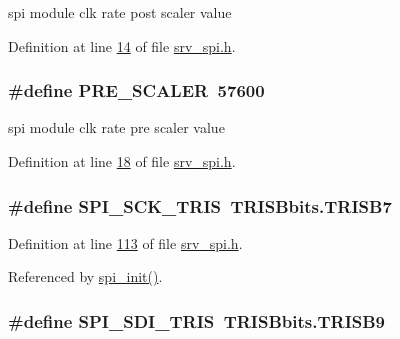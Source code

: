 spi module clk rate post scaler value 



Definition at line \hyperlink{a00013_source_l00014}{14} of file \hyperlink{a00013_source}{srv\+\_\+spi.\+h}.

\hypertarget{a00013_a5c1fd7fa207a92f0b4b78d39bbd2f34b}{
\subsubsection[{P\+R\+E\+\_\+\+S\+C\+A\+L\+E\+R}]{\setlength{\rightskip}{0pt plus 5cm}\#define P\+R\+E\+\_\+\+S\+C\+A\+L\+E\+R~57600}}\label{a00013_a5c1fd7fa207a92f0b4b78d39bbd2f34b}


spi module clk rate pre scaler value 



Definition at line \hyperlink{a00013_source_l00018}{18} of file \hyperlink{a00013_source}{srv\+\_\+spi.\+h}.

\hypertarget{a00013_a98c4bd0ee0f76eb205e874355bf9cd33}{
\subsubsection[{S\+P\+I\+\_\+\+S\+C\+K\+\_\+\+T\+R\+I\+S}]{\setlength{\rightskip}{0pt plus 5cm}\#define S\+P\+I\+\_\+\+S\+C\+K\+\_\+\+T\+R\+I\+S~T\+R\+I\+S\+Bbits.\+T\+R\+I\+S\+B7}}\label{a00013_a98c4bd0ee0f76eb205e874355bf9cd33}


Definition at line \hyperlink{a00013_source_l00113}{113} of file \hyperlink{a00013_source}{srv\+\_\+spi.\+h}.



Referenced by \hyperlink{a00032_source_l00030}{spi\+\_\+init()}.

\hypertarget{a00013_a40c85fd42ffb12b326b7cb9ee48f2ffb}{
\subsubsection[{S\+P\+I\+\_\+\+S\+D\+I\+\_\+\+T\+R\+I\+S}]{\setlength{\rightskip}{0pt plus 5cm}\#define S\+P\+I\+\_\+\+S\+D\+I\+\_\+\+T\+R\+I\+S~T\+R\+I\+S\+Bbits.\+T\+R\+I\+S\+B9}}\label{a00013_a40c85fd42ffb12b326b7cb9ee48f2ffb}


